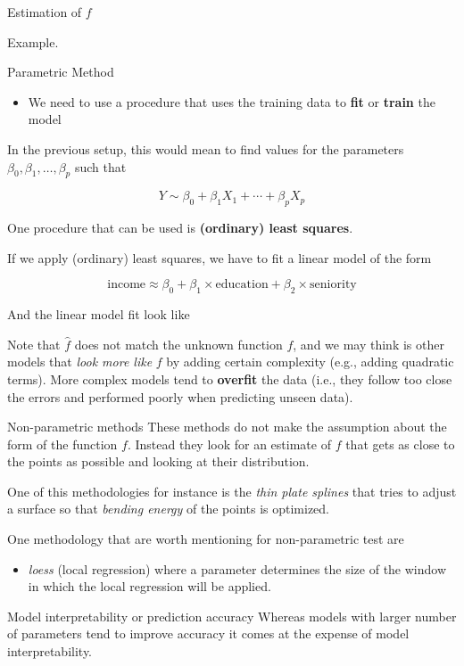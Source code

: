 \documentclass[
  ignorenonframetext,
]{beamer}
\providecommand{\tightlist}{%
  \setlength{\itemsep}{0pt}\setlength{\parskip}{0pt}}\usepackage{longtable,booktabs,array}
\begin{document}
\begin{frame}{Estimation of \(f\)}
\begin{block}{Example.}
\begin{block}{Parametric Method}
\begin{itemize}
\tightlist
\item
  We need to use a procedure that uses the training data to \textbf{fit}
  or \textbf{train} the model
\end{itemize}

In the previous setup, this would mean to find values for the parameters
\(\beta_0, \beta_1,\ldots,\beta_p\) such that

\[
Y \sim \beta_0+ \beta_1 X_1 + \cdots+ \beta_p X_p
\]

One procedure that can be used is \textbf{(ordinary) least squares}.

If we apply (ordinary) least squares, we have to fit a linear model of
the form

\[
\mathrm{income} \approx \beta_0 + \beta_1 \times\mathrm{education} + \beta_2 \times \mathrm{seniority}  
\]

And the linear model fit look like

Note that \(\hat{f}\) does not match the unknown function \(f\), and we
may think is other models that \emph{look more like} \(f\) by adding
certain complexity (e.g., adding quadratic terms). More complex models
tend to \textbf{overfit} the data (i.e., they follow too close the
errors and performed poorly when predicting unseen data).
\end{block}
\end{block}

\begin{block}{Non-parametric methods}
\label{non-parametric-methods}
These methods do not make the assumption about the form of the function
\(f\). Instead they look for an estimate of \(f\) that gets as close to
the points as possible and looking at their distribution.

One of this methodologies for instance is the \emph{thin plate splines}
that tries to adjust a surface so that \emph{bending energy} of the
points is optimized.

One methodology that are worth mentioning for non-parametric test are

\begin{itemize}
\tightlist
\item
  \emph{loess} (local regression) where a parameter determines the size
  of the window in which the local regression will be applied.
\end{itemize}
\end{block}

\begin{block}{Model interpretability or prediction accuracy}
\label{model-interpretability-or-prediction-accuracy}
Whereas models with larger number of parameters tend to improve accuracy
it comes at the expense of model interpretability.
\end{block}
\end{frame}
\end{document}
